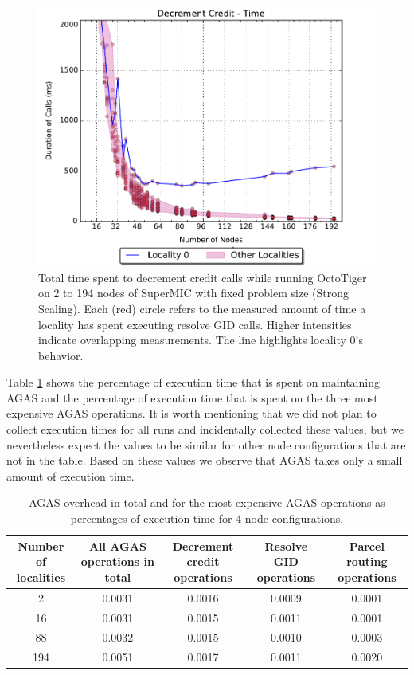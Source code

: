 \begin{figure}[t]
    \centering
    \includegraphics[width=.54\textwidth,height=\textheight,keepaspectratio]{graphs/octotiger_decrement_credit_time}
    \caption{Total time spent to decrement credit calls while running OctoTiger on 2 to 194 nodes of SuperMIC with fixed problem size (Strong Scaling). Each (red) circle refers to the measured amount of time a locality has spent executing resolve GID calls. Higher intensities indicate overlapping measurements. The line highlights locality 0's behavior.}
    \label{fig:octgr_strong_decr_cred}
\end{figure}

Table \ref{tab:exec-percent} shows the percentage of execution time that is
spent on maintaining AGAS and the percentage of execution time that is spent on the three most expensive AGAS operations. It is worth mentioning that we did not plan to
collect execution times for all runs and incidentally collected these
values, but we nevertheless expect the values to be similar for other node
configurations that are not in the table. Based on these values we observe that
AGAS takes only a small amount of execution time.

\begin{table}[t]
    \caption{AGAS overhead in total and for the most expensive AGAS operations as percentages of execution time for 4 node configurations.}
    \centering
    \label{tab:exec-percent}
    \begin{tabular}{ccccc}
        \toprule
        Number of localities & All AGAS operations in total & Decrement credit operations & Resolve GID operations & Parcel routing operations \\
        \hline
        2   & 0.0031 & 0.0016 & 0.0009 & 0.0001 \\
        16  & 0.0031 & 0.0015 & 0.0011 & 0.0001 \\
        88  & 0.0032 & 0.0015 & 0.0010 & 0.0003 \\
        194 & 0.0051 & 0.0017 & 0.0011 & 0.0020 \\
        \bottomrule
    \end{tabular}
\end{table}

